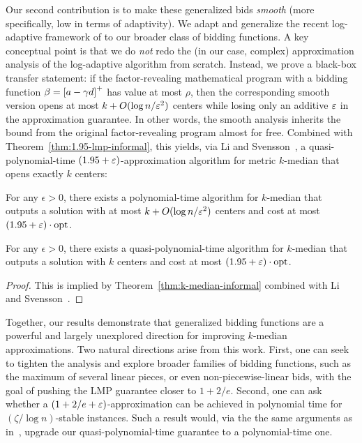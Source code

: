 Our second contribution is to make these generalized bids \emph{smooth} (more specifically, low in terms of adaptivity). We adapt and generalize the recent log-adaptive framework of \cite{MR4928455-Cohen25} to our broader class of bidding functions. A key conceptual point is that we do \emph{not} redo the (in our case, complex) approximation analysis of the log-adaptive algorithm from scratch. Instead, we prove a black-box transfer statement: if the factor-revealing mathematical program with a bidding function $\beta = \left[a - \gamma d\right]^+$ has value at most $\rho$, then the corresponding smooth version opens at most $k+O(\log n/\varepsilon^2)$ centers while losing only an additive $\varepsilon$ in the approximation guarantee. In other words, the smooth analysis inherits the bound from the original factor-revealing program almost for free. Combined with Theorem~\ref{thm:1.95-lmp-informal}, this yields, via Li and Svensson~\cite{LiS16}, a quasi-polynomial-time $(1.95+\varepsilon)$-approximation algorithm for metric $k$-median that opens exactly $k$ centers:

\begin{theorem}
\label{thm:k-median-informal}
For any $\epsilon > 0$, there exists a polynomial-time algorithm for $k$-median that outputs a solution with at most $k + O(\log n / \varepsilon^2)$ centers and cost at most $(1.95+\varepsilon) \cdot \mathrm{opt}$.
\end{theorem}

\begin{corollary}
\label{thm:k-median-exact-informal}
For any $\epsilon > 0$, there exists a quasi-polynomial-time algorithm for $k$-median that outputs a solution with $k$ centers and cost at most $(1.95+\varepsilon) \cdot  \mathrm{opt}$.
\end{corollary}
\begin{proof}
This is implied by Theorem~\ref{thm:k-median-informal} combined with Li and Svensson~\cite{LiS16}.
\end{proof}

Together, our results demonstrate that generalized bidding functions are a powerful and largely unexplored direction for improving $k$-median approximations. Two natural directions arise from this work. First, one can seek to tighten the analysis and explore broader families of bidding functions, such as the maximum of several linear pieces, or even non-piecewise-linear bids, with the goal of pushing the LMP guarantee closer to $1+2/e$. Second, one can ask whether a $(1+2/e+\varepsilon)$-approximation can be achieved in polynomial time for $(\zeta/\log n)$-stable instances. Such a result would, via the the same arguments as in~\cite{MR4928455-Cohen25}, upgrade our quasi-polynomial-time guarantee to a polynomial-time one.


